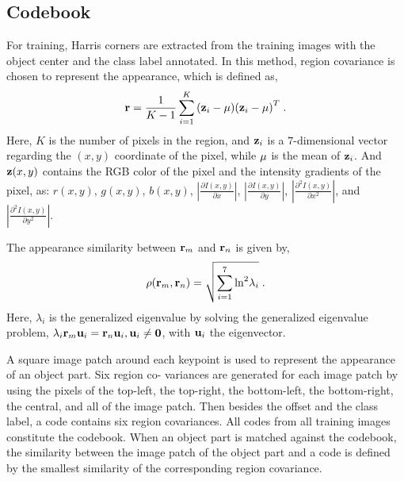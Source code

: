\subsection{Codebook}
For training, Harris corners are extracted from the training images with the object center and the class label annotated. In this method, region covariance is chosen to represent the appearance, which is defined as,
\[{\bf{r}} = \frac{1}{{K - 1}}\sum\limits_{i = 1}^K {({{\bf{z}}_i} - {\bf{\mu }}){{({{\bf{z}}_i} - {\bf{\mu }})}^T}} \;.\]
Here, $K$ is the number of pixels in the region, and ${{\bf{z}}_i}$ is a $7$-dimensional vector regarding the $(x,y)$ coordinate of the pixel, while ${\bf{\mu }}$ is the mean of ${{\bf{z}}_i}$.   And ${{\bf{z}}}(x,y)$ contains the RGB color of the pixel and the intensity gradients of the pixel, as: $r(x,y)$, $g(x,y)$, $b(x,y)$, $|\frac {\partial I(x,y)} {\partial x}|$, $|\frac{\partial I(x,y)}{\partial y}|$, $|\frac{{\partial ^2}I(x,y)}{\partial {x^2}}|$, and $|\frac{{\partial ^2}I(x,y)}{\partial {y^2}}|$.

The appearance similarity between ${\bf{r}}_m$ and ${\bf{r}}_n$ is given by,
\[
\rho ({\bf{r}}_m,{\bf{r}}_n) = \sqrt {\sum\limits_{i = 1}^7 {{{\ln }^2}{\lambda _i}} }\;.
\]
Here, $\lambda _i$ is the generalized eigenvalue by solving the generalized eigenvalue problem, ${\lambda _i}{\bf{r}}_m{{\bf{u}}_i} = {\bf{r}}_n {{\bf{u}}_i},{{\bf{u}}_i} \ne {\bf{0}}$, with ${\bf{u}}_i$ the eigenvector.

A square image patch around each keypoint is used to
represent the appearance of an object part. Six region co-
variances are generated for each image patch by using the
pixels of the top-left, the top-right, the bottom-left, the
bottom-right, the central, and all of the image patch. Then
besides the offset and the class label, a code contains six
region covariances. All codes from all training images constitute the codebook. When an object part is matched against
the codebook, the similarity between the image patch of the
object part and a code is defined by the smallest similarity
of the corresponding region covariance.
